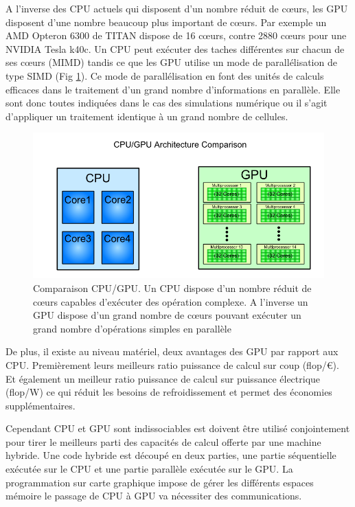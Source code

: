 A l'inverse des \ac{CPU} actuels qui disposent d'un nombre réduit de cœurs, les \ac{GPU} disposent d'une nombre beaucoup plus important de cœurs.
Par exemple un AMD Opteron 6300 de TITAN dispose de 16 cœurs, contre 2880 cœurs pour une NVIDIA Tesla k40c.
Un  \ac{CPU} peut exécuter des taches différentes sur chacun de ses cœurs (MIMD) tandis ce que les \ac{GPU} utilise un mode de parallélisation de type SIMD (Fig \ref{fig:cpugpu}).
Ce mode de parallélisation en font des unités de calculs efficaces dans le traitement d'un grand nombre d'informations en parallèle.
Elle sont donc toutes indiquées dans le cas des simulations numérique ou il s'agit d'appliquer un traitement identique à un grand nombre de cellules.

\begin{figure}
        \includegraphics[width=.95\linewidth]{img/02/cpu_vs_gpu.png} 
        \caption[Comparaison CPU/GPU]{Comparaison CPU/GPU. Un \ac{CPU} dispose d'un nombre réduit de cœurs capables d’exécuter des opération complexe. 
        A l'inverse un \ac{GPU} dispose d'un grand nombre de cœurs pouvant exécuter un grand nombre d'opérations simples en parallèle}
 		\label{fig:cpugpu}
\end{figure} 

De plus, il existe au niveau matériel, deux avantages des \ac{GPU} par rapport aux \ac{CPU}.
Premièrement leurs meilleurs ratio puissance de calcul sur coup (flop/€).
Et également un meilleur ratio puissance de calcul sur puissance électrique (flop/W) ce qui réduit les besoins de refroidissement et permet des économies supplémentaires.

Cependant \ac{CPU} et \ac{GPU} sont indissociables est doivent être utilisé conjointement pour tirer le meilleurs parti des capacités de calcul offerte par une machine hybride.
Une code hybride est découpé en deux parties, une partie séquentielle exécutée sur le \ac{CPU} et une partie parallèle exécutée sur le \ac{GPU}.
La programmation sur carte graphique impose de gérer les différents espaces mémoire le passage de \ac{CPU} à \ac{GPU} va nécessiter des communications.


